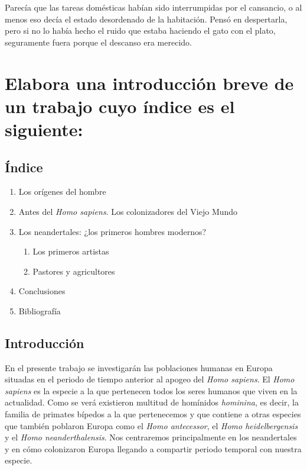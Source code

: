 \documentclass[12pt, a4paper, oneside]{report}
\begin{document}
        Parecía que las tareas domésticas habían sido interrumpidas por el cansancio, o al menos eso decía el
        estado desordenado de la habitación. Pensó en despertarla, pero si no lo había hecho el ruido que
        estaba haciendo el gato con el plato, seguramente fuera porque el descanso era merecido.
        \clearpage
    \chapter{Elabora una introducción breve de un trabajo cuyo índice es el siguiente:}
        \section*{Índice}
        \begin{Large}
            \renewcommand{\labelenumii}{\arabic{enumi}.\arabic{enumii}}
            \begin{enumerate}
                \item Los orígenes del hombre
                \item Antes del \emph{Homo sapiens}. Los colonizadores del Viejo Mundo
                \item Los neandertales: ¿los primeros hombres modernos?
                \begin{enumerate}
                    \item Los primeros artistas
                    \item Pastores y agricultores
                \end{enumerate}
                \item Conclusiones
                \item Bibliografía
            \end{enumerate}
        \end{Large}
        \clearpage
        \section*{Introducción}
            En el presente trabajo se investigarán las poblaciones humanas en Europa situadas en el periodo de
            tiempo anterior al apogeo del \emph{Homo sapiens}. El \emph{Homo sapiens} es la especie a la que
            pertenecen todos los seres humanos que viven en la actualidad. Como se verá existieron multitud de
            homínidos \emph{hominina}, es decir, la familia de primates bípedos a la que pertenecemos y que contiene a
            otras especies que también poblaron Europa como el \emph{Homo antecessor}, el
            \emph{Homo heidelbergensis} y el \emph{Homo neanderthalensis}. Nos centraremos principalmente en
            los neandertales y en cómo colonizaron Europa llegando a compartir periodo temporal con nuestra
            especie.
\end{document}
